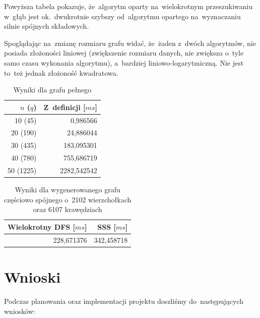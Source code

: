 \documentclass[a4paper,12pt]{mwart}
\begin{document}
Powyższa tabela pokazuje, że~algorytm oparty na~wielokrotnym przeszukiwaniu
w~głąb jest ok.~dwukrotnie szybszy od~algorytmu opartego na~wyznaczaniu silnie
spójnych składowych.

Spoglądając na~zmianę rozmiaru grafu widać, że~żaden z~dwóch algorytmów, nie
posiada złożoności liniowej (zwiększenie rozmiaru danych, nie zwiększa o~tyle
samo czasu wykonania algorytmu), a~bardziej
liniowo-loga\dywiz{}ryt\dywiz{}miczną. Nie jest to~też jednak złożoność
kwadratowa.

\begin{table}[H]
  \centering
  \begin{tabular}{ r r }
    $n$ ($q$) & Z~definicji [$ms$] \\
    \hline
    10 (45) & 0,986566 \\
    20 (190) & 24,886044 \\
    30 (435) & 183,095301 \\
    40 (780) & 755,686719 \\
    50 (1225) & 2282,542542 \\
  \end{tabular}
  \caption{Wyniki dla grafu pełnego}
\end{table}

\begin{table}[H]
  \centering
  \begin{tabular}{ r r }
    Wielokrotny DFS [$ms$] & SSS [$ms$] \\
    \hline
    228,671376 & 342,458718 \\
  \end{tabular}
  \caption{Wyniki dla wygenerowanego grafu częściowo spójnego
    o~2102 wierzchołkach oraz 6107 krawędziach}
\end{table}

\section{Wnioski}

Podczas planowania oraz implementacji projektu doszliśmy do~następujących
wniosków:
\end{document}
